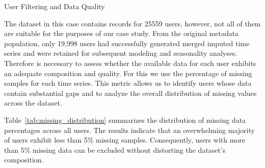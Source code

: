 ﻿\documentclass[12pt,reqno, twoside]{amsbook}
\makeatletter
\numberwithin{figure}{chapter}
\numberwithin{table}{chapter}
\numberwithin{equation}{chapter}
\def\subsection{\@startsection{subsection}{2}%
      \z@{.5\linespacing\@plus.7\linespacing}{.25\linespacing}%
      {\normalfont\bfseries\flushleft}}
\theoremstyle{plain}
\numberwithin{equation}{chapter}
\numberwithin{section}{chapter}
\makeatother
\begin{document}
\subsection{User Filtering and Data Quality}

\noindent 
The dataset in this case contains records for 25559 users, however, not all of them are suitable for the purposes of our case study.
From the original metadata population, only 19,998 users had successfully generated merged imputed time series and were retained for subsequent modeling and seasonality analyses.
Therefore is necessary to assess whether the available data for each user exhibits an adequate composition and quality. For this we use the percentage of missing samples for each time series. This metric allows us to identify users whose data contain substantial gaps and to analyze the overall distribution of missing values across the dataset.

Table~\ref{tab:missing_distribution} summarizes the distribution of missing data percentages across all users. The results indicate that an overwhelming majority of users exhibit less than 5\% missing samples. Consequently, users with more than 5\% missing data can be excluded without distorting the dataset's composition.
\end{document}
